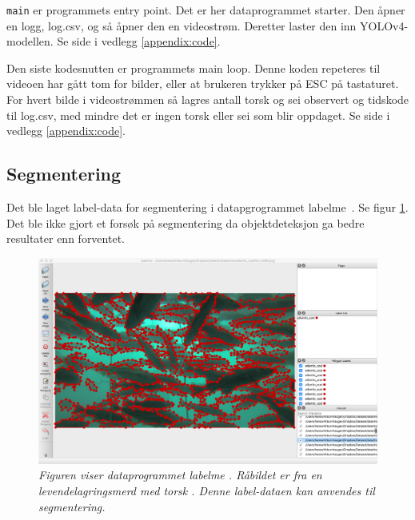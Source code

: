 \texttt{main} er programmets entry point. Det er her dataprogrammet starter. Den åpner en logg, log.csv, og så åpner den en videostrøm. Deretter laster den inn YOLOv4-modellen. Se side \pageref{lst:main} i vedlegg \ref{appendix:code}.

Den siste kodesnutten er programmets main loop. Denne koden repeteres til videoen har gått tom for bilder, eller at brukeren trykker på ESC på tastaturet. For hvert bilde i videostrømmen så lagres antall torsk og sei observert og tidskode til log.csv, med mindre det er ingen torsk eller sei som blir oppdaget. Se side \pageref{lst:mainloop} i vedlegg \ref{appendix:code}.


\subsection{Segmentering}

Det ble laget label-data for segmentering i datapgrogrammet labelme \cite{Wada 2016}. Se figur \ref{fig:labelme}. Det ble ikke gjort et forsøk på segmentering da objektdeteksjon ga bedre resultater enn forventet.

\begin{figure}[h!]
\begin{center} 
\includegraphics[scale=0.25]{figures/labelme}
\caption{\small \sl Figuren viser dataprogrammet labelme \cite{Wada 2016}. Råbildet er fra en levendelagringsmerd med torsk \cite{Nofima 2020}. Denne label-dataen kan anvendes til segmentering.\label{fig:labelme}} 
\end{center} 
\end{figure} 
